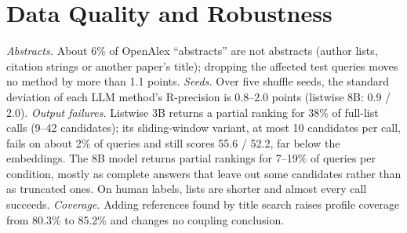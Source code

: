 \documentclass[sigconf,nonacm]{acmart}
\begin{document}
\section{Data Quality and Robustness}
\label{app:robustness}
\emph{Abstracts.} About 6\% of OpenAlex ``abstracts'' are not abstracts (author lists, citation strings or another paper's title); dropping the affected test queries moves no method by more than 1.1 points.
\emph{Seeds.} Over five shuffle seeds, the standard deviation of each LLM method's R-precision is 0.8--2.0 points (listwise 8B: 0.9 / 2.0).
\emph{Output failures.} Listwise 3B returns a partial ranking for 38\% of full-list calls (9--42 candidates); its sliding-window variant, at most 10 candidates per call, fails on about 2\% of queries and still scores 55.6 / 52.2, far below the embeddings. The 8B model returns partial rankings for 7--19\% of queries per condition, mostly as complete answers that leave out some candidates rather than as truncated ones. On human labels, lists are shorter and almost every call succeeds.
\emph{Coverage.} Adding references found by title search raises profile coverage from 80.3\% to 85.2\% and changes no coupling conclusion.
\end{document}
